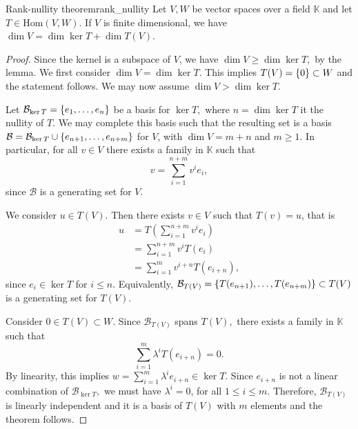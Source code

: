 \begin{theorem}{Rank-nullity theorem}{rank_nullity}
    Let \(V, W\) be vector spaces over a field \(\mathbb{K}\) and let \(T \in \mathrm{Hom}(V,W)\). If \(V\) is finite dimensional, we have \(\dim V = \dim \ker T + \dim T(V)\).
\end{theorem}
\begin{proof}
    Since the kernel is a subspace of \(V\), we have \(\dim V \geq \dim \ker T,\) by the lemma. We first consider \(\dim V = \dim \ker T\). This implies \(T(V) = \{0\} \subset W\) and the statement follows. We may now assume \(\dim V > \dim \ker T\).

    Let \(\mathcal{B}_{\ker T} = \{e_1, \dots, e_n\}\) be a basis for \(\ker T,\) where \(n = \dim\ker T\) it the nullity of \(T\). We may complete this basis such that the resulting set is a basis \(\mathcal{B} = \mathcal{B}_{\ker T} \cup \{e_{n+1}, \dots, e_{n+m}\}\) for \(V\), with \(\dim V = m + n\) and \(m \geq 1\). In particular, for all \(v \in V\) there exists a family  in \(\mathbb{K}\) such that
    \begin{equation*}
        v = \sum_{i=1}^{n+m} v^ie_i,
    \end{equation*}
    since \(\mathcal{B}\) is a generating set for \(V\).

    We consider \(u \in T(V)\). Then there exists \(v \in V\) such that \(T(v) = u\), that is
    \begin{align*}
        u &= T\left(\sum_{i=1}^{n+m} v^ie_i\right)\\
          &= \sum_{i=1}^{n+m} v^i T(e_i)\\
          &= \sum_{i=1}^{m} v^{i+n} T(e_{i+n}),
    \end{align*}
    since \(e_i \in \ker T\) for \(i \leq n\). Equivalently, \(\mathcal{B}_{T(V)} = \{T(e_{n+1}), \dots, T(e_{n+m})\} \subset T(V)\) is a generating set for \(T(V)\).

    Consider \(0 \in T(V) \subset W\). Since \(\mathcal{B}_{T(V)}\) spans \(T(V),\) there exists a family  in \(\mathbb{K}\) such that
    \begin{equation*}
        \sum_{i=1}^m \lambda^i T(e_{i+n}) = 0.
    \end{equation*}
    By linearity, this implies \(w = \sum_{i=1}^m \lambda^ie_{i+n} \in \ker T\). Since \(e_{i+n}\) is not a linear combination of \(\mathcal{B}_{\ker T},\) we must have \(\lambda^i = 0\), for all \(1 \leq i \leq m\). Therefore, \(\mathcal{B}_{T(V)}\) is linearly independent and it is a basis of \(T(V)\) with \(m\) elements and the theorem follows.
\end{proof}
